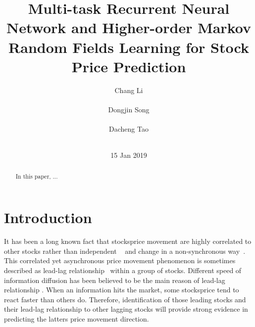 \documentclass[sigconf, anonymous, review]{acmart}
\renewcommand{\cite}{\citep}
\begin{document}
\title{ Multi-task Recurrent Neural Network and
  Higher-order Markov Random Fields Learning for Stock Price
  Prediction}


\author{
\alignauthor Chang Li \\
       \\
\alignauthor Dongjin Song \\
       \\
\alignauthor Dacheng Tao\\
       \\
}
\date{15 Jan 2019}


\begin{abstract}
In this paper, ...

\end{abstract}

\maketitle

\section{Introduction}


It has been a long known fact that stocks\textquotesingle price movement are
highly correlated to other stocks rather than independent
~\cite{lo1990contrarian,mech1993portfolio} and change in a
non-synchronous
way~\cite{lo1990contrarian,brennan1993investment}. This
correlated yet asynchronous price movement phenomenon is
sometimes described as lead-lag
relationship~\cite{hou2007industry} within a group of stocks.
Different speed of information diffusion has been believed to be
the main reason of lead-lag relationship
\cite{lo1990contrarian,badrinath1995shepherds,mcqueen1996delayed}.
When an information hits the market, some stocks\textquotesingle price tend to
react faster than others do. Therefore, identification of those
leading stocks and their lead-lag relationship to other lagging
stocks will provide strong evidence in predicting the latter\textquotesingle s
price movement direction.
\end{document}

